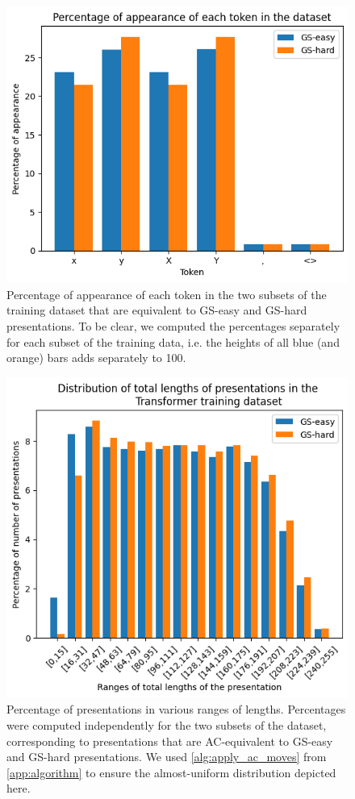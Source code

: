 \begin{figure}
	\centering
	\includegraphics[scale=0.6]{fig/tokens_hist.png}
	\caption{Percentage of appearance of each token in the two subsets of the training dataset that are equivalent to GS-easy and GS-hard presentations.
	To be clear, we computed the percentages separately for each subset of the training data, i.e. the heights of all blue (and orange) bars adds separately to 100.}
	\label{fig:tokens_hist}
\end{figure}

\begin{figure}
	\centering
	\includegraphics[scale=0.6]{fig/gpt_data_length_distribution.png}
	\caption{Percentage of presentations in various ranges of lengths.
	Percentages were computed independently for the two subsets of the dataset, corresponding to presentations that are AC-equivalent to GS-easy and GS-hard presentations.
	We used \autoref{alg:apply_ac_moves} from \autoref{app:algorithm} to ensure the almost-uniform distribution depicted here.}
	\label{fig:gpt_data}
\end{figure}

